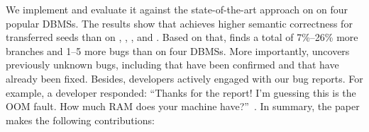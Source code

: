\documentclass[sigconf,review,anonymous]{acmart}
\begin{document}
We implement \tool{} and evaluate it against the state-of-the-art approach \sedar{} on
on four popular DBMSs.
The results show that \tool{} achieves \translateratio{} higher semantic correctness for transferred seeds than \tool{} on \duckdb{}, \clickhouse{}, \monetdb{}, and \virtuoso{}.
Based on that, \tool{} finds a total of 7\%--26\% more branches and 1--5 more bugs than \sedar{} on four DBMSs. 
More importantly, \tool{} uncovers \bugcnt{} previously unknown bugs, including \bugconfirmcnt{} that have been confirmed and \bugfixcnt{} that have already been fixed.
Besides, developers actively engaged with our bug reports. For example, a \duckdb{} developer responded: ``Thanks for the report! I'm guessing this is the OOM fault. How much RAM does your machine have?''~\cite{duckdb-issue-20197}.
In summary, the paper makes the following contributions:
\end{document}
